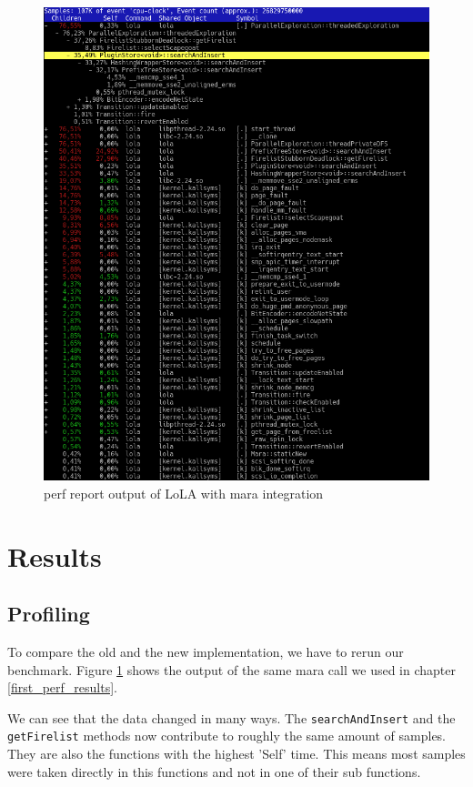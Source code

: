 \begin{figure}
    \centering
    \includegraphics[width=\textwidth]{pictures/perfReportMara.png}
    \caption{perf report output of LoLA with mara integration}
    \label{perf_record_mara}
\end{figure}

\section{Results}
\subsection{Profiling}
To compare the old and the new implementation, we have to rerun our benchmark. Figure \ref{perf_record_mara} shows the output of the same mara call we used in chapter \ref{first_perf_results}.

We can see that the data changed in many ways. The \texttt{searchAndInsert} and the \texttt{getFirelist} methods now contribute to roughly the same amount of samples. They are also the functions with the highest 'Self' time. This means most samples were taken directly in this functions and not in one of their sub functions.

